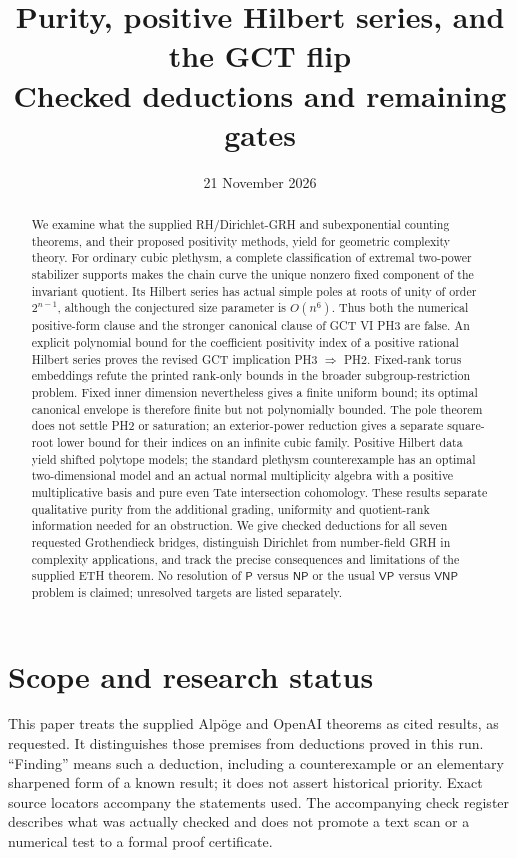 \documentclass[11pt,a4paper]{article}
\title{Purity, positive Hilbert series, and the GCT flip\\[5pt]\large Checked deductions and remaining gates}
\author{}
\date{21 November 2026}
\begin{document}
\maketitle
\begin{abstract}
We examine what the supplied RH/Dirichlet-GRH and subexponential counting
theorems, and their proposed positivity methods, yield for geometric
complexity theory. For ordinary cubic plethysm, a complete classification
of extremal two-power stabilizer supports makes the chain curve the unique
nonzero fixed component of the invariant quotient. Its Hilbert series
has actual simple poles at roots of unity of order $2^{n-1}$,
although the conjectured size
parameter is $O(n^6)$. Thus both the numerical positive-form clause and
the stronger canonical clause of GCT VI PH3 are false. An explicit
polynomial bound for the coefficient
positivity index of a positive rational Hilbert series proves the revised
GCT implication PH3 $\Rightarrow$ PH2. Fixed-rank torus embeddings refute
the printed rank-only bounds in the broader subgroup-restriction problem.
Fixed inner dimension nevertheless gives a finite uniform bound; its
optimal canonical envelope is therefore finite but not polynomially
bounded. The pole theorem does not settle PH2 or saturation; an
exterior-power reduction gives a separate square-root lower bound for
their indices on an infinite cubic family. Positive Hilbert data yield shifted polytope models; the
standard plethysm counterexample has an optimal two-dimensional model
and an actual normal multiplicity algebra with a positive multiplicative
basis and pure even Tate intersection cohomology. These results separate qualitative purity
from the additional grading, uniformity and quotient-rank information
needed for an obstruction. We give checked deductions for all seven
requested Grothendieck bridges, distinguish Dirichlet from number-field
GRH in complexity applications, and track the precise consequences and
limitations of the supplied ETH theorem. No resolution of $\mathsf P$
versus $\mathsf{NP}$ or the usual $\mathsf{VP}$ versus $\mathsf{VNP}$
problem is claimed; unresolved targets are listed separately.
\end{abstract}
{\small\setlength{\parskip}{0pt}\tableofcontents}
\clearpage


\section*{Scope and research status}
This paper treats the supplied Alp\"oge and OpenAI theorems as cited
results, as requested. It distinguishes those premises from deductions
proved in this run. ``Finding'' means such a deduction, including a
counterexample or an elementary sharpened form of a known result; it does
not assert historical priority. Exact source locators accompany the
statements used. The accompanying check register describes what was
actually checked and does not promote a text scan or a numerical test to
a formal proof certificate.
\end{document}
